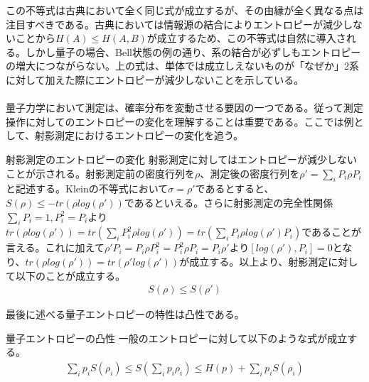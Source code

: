 \documentclass[a4paper,10.5pt]{article}
\numberwithin{equation}{section}
\begin{document}
この不等式は古典において全く同じ式が成立するが、その由縁が全く異なる点は注目すべきである。古典においては情報源の結合によりエントロピーが減少しないことから$H(A)\leq H(A,B)$が成立するため、この不等式は自然に導入される。しかし量子の場合、Bell状態の例の通り、系の結合が必ずしもエントロピーの増大につながらない。上の式は、単体では成立しえないものが「なぜか」2系に対して加えた際にエントロピーが減少しないことを示している。\\
\\
量子力学において測定は、確率分布を変動させる要因の一つである。従って測定操作に対してのエントロピーの変化を理解することは重要である。ここでは例として、射影測定におけるエントロピーの変化を追う。
\begin{examplebox}{射影測定のエントロピーの変化}
射影測定に対してはエントロピーが減少しないことが示される。射影測定前の密度行列を$\rho$、測定後の密度行列を$\rho'=\sum_{i}P_{i}\rho P_{i}$と記述する。Kleinの不等式において$\sigma=\rho'$であるとすると、$S(\rho)\leq -tr(\rho log(\rho'))$であるといえる。さらに射影測定の完全性関係$\sum_{i}P_{i}=1,P_{i}^{2}=P_{i}$より$tr(\rho log(\rho'))=tr(\sum_{i}P_{i}^{2}\rho log(\rho'))=tr(\sum_{i}P_{i}\rho log(\rho')P_{i})$であることが言える。これに加えて$\rho'P_{i}=P_{i}\rho P_{i}^{2}=P_{i}^{2}\rho P_{i}=P_{i}\rho'$より$[log(\rho'),P_{i}]=0$となり、$tr(\rho log(\rho'))=tr(\rho'log(\rho'))$が成立する。以上より、射影測定に対して以下のことが成立する。
\begin{equation}\begin{split}
    S(\rho) \leq S(\rho')
\end{split} \end{equation}
\end{examplebox}
最後に述べる量子エントロピーの特性は凸性である。
\begin{theorembox}{量子エントロピーの凸性}
一般のエントロピーに対して以下のような式が成立する。
\begin{equation}\begin{split}
    \sum_{i}p_{i}S(\rho_{i})\leq S(\sum_{i}p_{i}\rho_{i}) \leq H(p) +\sum_{i} p_{i}S(\rho_{i}) 
\end{split} \end{equation}
\end{theorembox}
\end{document}
